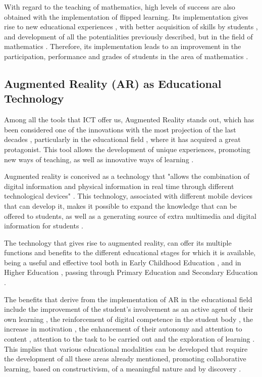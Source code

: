 \documentclass[english]{textolivre}
\begin{document}
With regard to the teaching of mathematics, high levels of success are also obtained with the implementation of flipped learning. Its implementation gives rise to new educational experiences \cite{hodges2011}, with better acquisition of skills by students \cite{cruz2012}, and development of all the potentialities previously described, but in the field of mathematics \cite{dearaujo2017, bishop2013}. Therefore, its implementation leads to an improvement in the participation, performance and grades of students in the area of mathematics \cite{adams2018, amstelveen2019, sun2018}.

\subsection{Augmented Reality (AR) as Educational Technology}
Among all the tools that ICT offer us, Augmented Reality stands out, which has been considered one of the innovations with the most projection of the last decades \cite{lorenzo2018}, 
particularly in the educational field \cite{cabero2019},
where it has acquired a great protagonist. This tool allows the development of unique experiences, promoting new ways of teaching, as well as innovative ways of learning \cite{cheng2017}.  

Augmented reality is conceived as a technology that "allows the combination of digital information and physical information in real time through different technological devices" \cite{barroso2017}. This technology, associated with different mobile devices that can develop it, makes it possible to expand the knowledge that can be offered to students, as well as a generating source of extra multimedia and digital information for students \cite{gomez2018}.

The technology that gives rise to augmented reality, can offer its multiple functions and benefits to the different educational stages for which it is available, being a useful and effective tool both in Early Childhood Education \cite{lopezbelmonte+pozosanchez+lopezbelmonte2019}, and in Higher Education \cite{garay2017}, passing through Primary Education \cite{lopezbelmonte+pozosanchez+fuentescabrera+romero2020} and Secondary Education \cite{morenoguerrero+romerorodriguez+lopezbelmonte+alonsogarcia2020}.  

The benefits that derive from the implementation of AR in the educational field include the improvement of the student's involvement as an active agent of their own learning \cite{caberollorentegutierrez2017}, the reinforcement of digital competence in the student body \cite{toledo2017}, the increase in motivation \cite{bacca2014}, the enhancement of their autonomy and attention to content \cite{marincabero2018}, attention to the task to be carried out \cite{cheng2017} and the exploration of learning \cite{fombonavazquez2017}. This implies that various educational modalities can be developed that require the development of all these areas already mentioned, promoting collaborative learning, based on constructivism, of a meaningful nature and by discovery \cite{caberollorentemarin2017}. 
\end{document}
